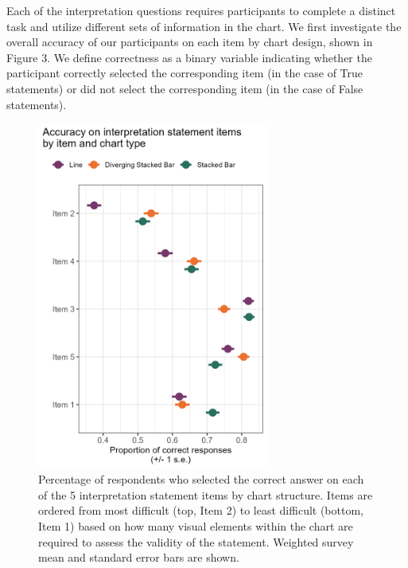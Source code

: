 \documentclass{IEEEcsmag}
\begin{document}
Each of the interpretation questions requires participants to complete a distinct task and utilize different sets of information in the chart. We first investigate the overall accuracy of our participants on each item by chart design, shown in Figure 3. We define correctness as a binary variable indicating whether the participant correctly selected the corresponding item (in the case of True statements) or did not select the corresponding item (in the case of False statements).

\begin{figure}



\includegraphics[width=18pc]{images/accbyitem.png}
\caption{Percentage of respondents who selected the correct answer on each of the 5 interpretation statement items by chart structure. Items are ordered from most difficult (top, Item 2) to least difficult (bottom, Item 1) based on how many visual elements within the chart are required to assess the validity of the statement. Weighted survey mean and standard error bars are shown.}
\end{figure}
\end{document}
